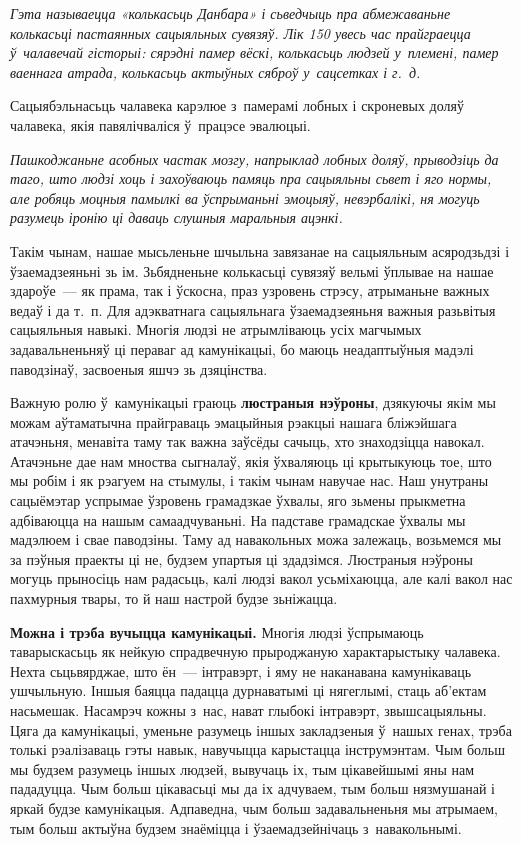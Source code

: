 
\emph{Гэта называецца «колькасьць Данбара» і сьведчыць пра абмежаваньне колькасьці пастаянных сацыяльных сувязяў. Лік 150 увесь час прайграецца ў~чалавечай гісторыі: сярэдні памер вёскі, колькасьць людзей у~племені, памер ваеннага атрада, колькасьць актыўных сяброў у~сацсетках і г.~д.}

Сацыябэльнасьць чалавека карэлюе з~памерамі лобных і скроневых доляў чалавека, якія павялічваліся ў~працэсе эвалюцыі.

\emph{Пашкоджаньне асобных частак мозгу, напрыклад лобных доляў, прыводзіць да таго, што людзі хоць і захоўваюць памяць пра сацыяльны сьвет і яго нормы, але робяць моцныя памылкі ва ўспрыманьні эмоцыяў, невэрбалікі, ня могуць разумець іронію ці даваць слушныя маральныя ацэнкі.}

Такім чынам, нашае мысьленьне шчыльна завязанае на сацыяльным асяродзьдзі і ўзаемадзеяньні зь ім. Зьбядненьне колькасьці сувязяў вельмі ўплывае на нашае здароўе~--- як прама, так і ўскосна, праз узровень стрэсу, атрыманьне важных ведаў і да т.~п. Для адэкватнага сацыяльнага ўзаемадзеяньня важныя разьвітыя сацыяльныя навыкі. Многія людзі не атрымліваюць усіх магчымых задавальненьняў ці пераваг ад камунікацыі, бо маюць неадаптыўныя мадэлі паводзінаў, засвоеныя яшчэ зь дзяцінства. 

Важную ролю ў~камунікацыі граюць \textbf{люстраныя нэўроны}, дзякуючы якім мы можам аўтаматычна прайграваць эмацыйныя рэакцыі нашага бліжэйшага атачэньня, менавіта таму так важна заўсёды сачыць, хто знаходзіцца навокал. Атачэньне дае нам мноства сыгналаў, якія ўхваляюць ці крытыкуюць тое, што мы робім і як рэагуем на стымулы, і такім чынам навучае нас. Наш унутраны сацыёмэтар успрымае ўзровень грамадзкае ўхвалы, яго зьмены прыкметна адбіваюцца на нашым самаадчуваньні. На падставе грамадскае ўхвалы мы мадэлюем і свае паводзіны. Таму ад навакольных можа залежаць, возьмемся мы за пэўныя праекты ці не, будзем упартыя ці здадзімся. Люстраныя нэўроны могуць прыносіць нам радасьць, калі людзі вакол усьміхаюцца, але калі вакол нас пахмурныя твары, то й наш настрой будзе зьніжацца.

\textbf{Можна і трэба вучыцца камунікацыі.} Многія людзі ўспрымаюць таварыскасьць як нейкую спрадвечную прыроджаную характарыстыку чалавека. Нехта сьцьвярджае, што ён~--- інтравэрт, і яму не наканавана камунікаваць ушчыльную. Іншыя баяцца падацца дурнаватымі ці нягеглымі, стаць аб'ектам насьмешак. Насамрэч кожны з~нас, нават глыбокі інтравэрт, звышсацыяльны. Цяга да камунікацыі, уменьне разумець іншых закладзеныя ў~нашых генах, трэба толькі рэалізаваць гэты навык, навучыцца карыстацца інструмэнтам. Чым больш мы будзем разумець іншых людзей, вывучаць іх, тым цікавейшымі яны нам пададуцца. Чым больш цікавасьці мы да іх адчуваем, тым больш нязмушанай і яркай будзе камунікацыя. Адпаведна, чым больш задавальненьня мы атрымаем, тым больш актыўна будзем знаёміцца і ўзаемадзейнічаць з~навакольнымі.


